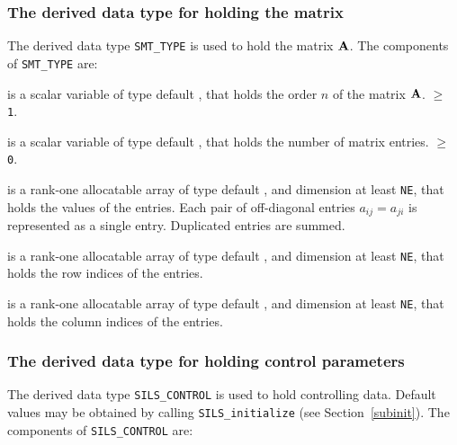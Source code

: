 \documentclass{galahad}
\newcommand{\packagename}{SILS}
\begin{document}
\subsubsection{The derived data type for holding the matrix}\label{typeprob}
The derived data type {\tt SMT\_TYPE} is used to hold the matrix ${\mathbf{A}}$.
The components of {\tt SMT\_TYPE} are:

\begin{description}

 is a scalar variable of type default \integer, that holds
the order $n$ of the matrix  ${\mathbf{A}}$.
 $\geq$ {\tt 1}.

 is a scalar variable of type default \integer, that holds the
number of matrix entries.
 $\geq$ {\tt 0}.

 is a rank-one allocatable array of type default \realdp,
and dimension at least {\tt NE}, that holds the values of the entries.
Each pair of off-diagonal entries $a_{ij} = a_{ji} $
is represented as a single entry. Duplicated entries are summed.

 is a rank-one allocatable array of type default \integer,
and dimension at least {\tt NE}, that holds the row indices of the entries.

 is a rank-one allocatable array of type default \integer,
and dimension at least {\tt NE}, that holds the column indices of the entries.

\end{description}


\subsubsection{The derived data type for holding control
 parameters}\label{typecontrol}
The derived data type
{\tt \packagename\_CONTROL}
is used to hold controlling data. Default values may be obtained by calling
{\tt \packagename\_initialize}
(see Section~\ref{subinit}). The components of
{\tt \packagename\_CONTROL}
are:
\end{document}

